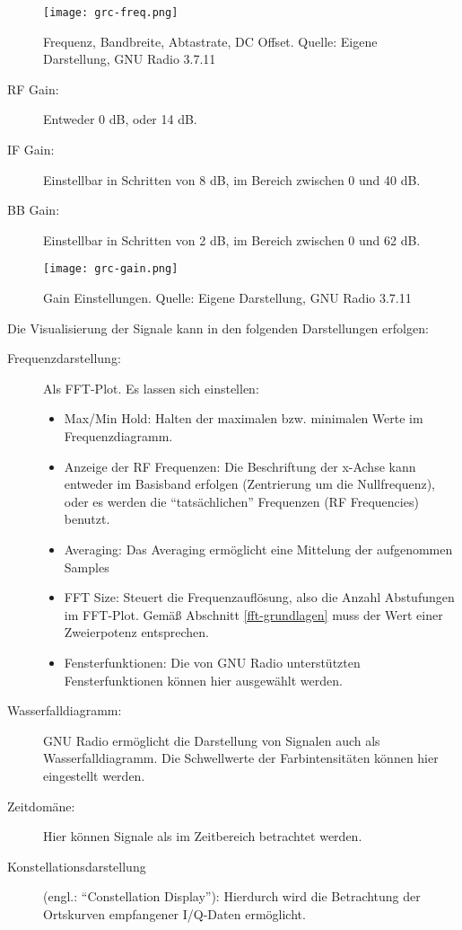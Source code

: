 \begin{figure}[ht]
	\centering
	\texttt{[image: grc-freq.png]}
	\caption[Frequenz, Bandbreite, Abtastrate, DC Offset]{Frequenz, Bandbreite, Abtastrate, DC Offset. Quelle: Eigene Darstellung, GNU Radio 3.7.11} 
	\label{grc-freq}
\end{figure}

\newpage
\begin{description}
	\item[RF Gain:] Entweder 0 dB, oder 14 dB. 
	\item[IF Gain:] Einstellbar in Schritten von 8 dB, im Bereich zwischen 0 und 40 dB.
	\item[BB Gain:] Einstellbar in Schritten von 2 dB, im Bereich zwischen 0 und 62 dB.
\end{description}

\begin{figure}[ht]
	\centering
	\texttt{[image: grc-gain.png]}
	\caption[Gain Einstellungen]{Gain Einstellungen. Quelle: Eigene Darstellung, GNU Radio 3.7.11} 
	\label{grc-gain}
\end{figure}

Die Visualisierung der Signale kann in den folgenden Darstellungen erfolgen:
\begin{description}
	\item[Frequenzdarstellung:] Als FFT-Plot. Es lassen sich einstellen:
		\begin{itemize}
			\item Max/Min Hold: Halten der maximalen bzw. minimalen Werte im Frequenzdiagramm.
			\item Anzeige der RF Frequenzen: Die Beschriftung der x-Achse kann entweder im Basisband erfolgen (Zentrierung um die Nullfrequenz), oder es werden die \enquote{tatsächlichen} Frequenzen (RF Frequencies) benutzt.
			\item  Averaging: Das Averaging ermöglicht eine Mittelung der aufgenommen Samples
			\item FFT Size: Steuert die Frequenzauflösung, also die Anzahl Abstufungen im FFT-Plot. Gemäß Abschnitt \ref{fft-grundlagen} muss der Wert einer Zweierpotenz entsprechen.
			\item Fensterfunktionen: Die von GNU Radio unterstützten Fensterfunktionen können hier ausgewählt werden.
		\end{itemize}
	\item[Wasserfalldiagramm:] GNU Radio ermöglicht die Darstellung von Signalen auch als Wasserfalldiagramm. Die Schwellwerte der Farbintensitäten können hier eingestellt werden. 
	\item[Zeitdomäne:] Hier können Signale als im Zeitbereich betrachtet werden.
	\item[Konstellationsdarstellung] (engl.: \enquote{Constellation Display}): Hierdurch wird die Betrachtung der Ortskurven empfangener I/Q-Daten ermöglicht.
\end{description}


